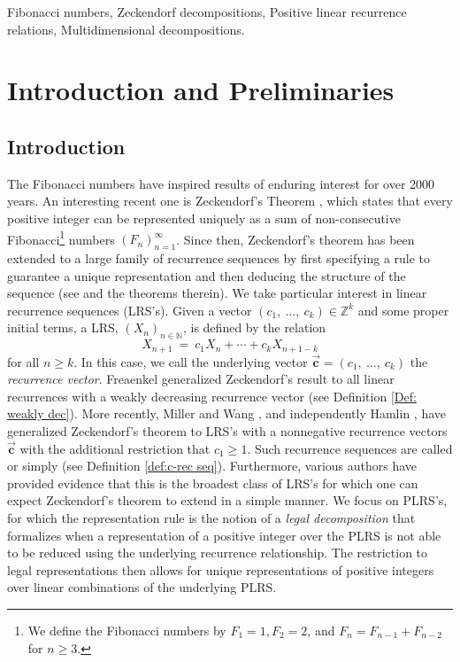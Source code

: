 \documentclass[]{interact}
\newcommand{\N}{{\mathbb N}}  %
\newcommand{\Z}{{\mathbb Z}}  %
\let\emph\relax %
\newcommand{\vtr}[1]{\vec{\mathbf{#1}}}
\theoremstyle{plain}
\numberwithin{equation}{section} %
\numberwithin{table}{section} %
\numberwithin{figure}{section}
\begin{document}
\begin{keywords}
	Fibonacci numbers, Zeckendorf decompositions, Positive
linear recurrence relations, Multidimensional decompositions.
\end{keywords}

\tableofcontents

\section{Introduction and Preliminaries}
\subsection{Introduction}
\indent \indent The Fibonacci numbers have inspired results of enduring interest for over 2000 years. An interesting recent one is Zeckendorf's Theorem \textcolor{blue}{\cite{Zeckendorf72}}, which states that every positive integer can be represented uniquely as a sum of non-consecutive Fibonacci\footnote{We define the Fibonacci numbers by $F_1 = 1,  F_2 = 2$, and $F_{n}=F_{n-1}+F_{n-2}$ for $n\geq 3$.} numbers $(F_n)_{n=1}^\infty$. Since then, Zeckendorf's theorem has been extended to a large family of recurrence sequences by first specifying a rule to guarantee a unique representation and then deducing the structure of the sequence (see \textcolor{blue}{\cite{ABJ11, BILMTB-A15, BCCSW, BDEMMTTW, BILMT2, CFHMN1, DDKMMV14, DFFHMPP, GTNP, Ha, KKMW11, MW12, MW2}} and the theorems therein). We take particular interest in linear recurrence sequences (LRS's). Given a vector $(c_1, \ \ldots , \ c_k) \in \Z^{k}$ and some proper initial terms, a LRS, $(X_n)_{n\in \N}$, is defined by the relation 
$$X_{n+1} \ =\ c_1 X_{n} + \cdots + c_k X_{n+1-k}$$
for all $n\geq k$. In this case, we call the underlying vector $\vtr{c}=(c_1, \ \ldots, \ c_k)$ the \textit{recurrence vector}. Freaenkel \textcolor{blue}{\cite{Fr}} generalized Zeckendorf's result to all linear recurrences with a weakly decreasing recurrence vector (see Definition \textcolor{blue}{\ref{Def: weakly dec}}). More recently, Miller and Wang \textcolor{blue}{\cite{MW12, MW2}}, and independently Hamlin \textcolor{blue}{\cite{Ha}}, have generalized Zeckendorf's theorem to LRS's with a nonnegative recurrence vectors $\vtr{c}$ with the additional restriction that $c_1 \geq 1$. Such recurrence sequences are called \emph{Positive Linear Recurrence Sequences} or simply \emph{PLRS's} (see Definition \textcolor{blue}{\ref{def:c-rec seq}}). Furthermore, various authors \textcolor{blue}{\cite{Ha, CFHMN1, CFHMNPX}} have provided evidence that this is the broadest class of LRS's for which one can expect Zeckendorf's theorem to extend in a simple manner. We focus on PLRS's, for which the representation rule is the notion of a \textit{legal decomposition} that formalizes when a representation of a positive integer over the PLRS is not able to be reduced using the underlying recurrence relationship. The restriction to legal representations then allows for unique representations of positive integers over linear combinations of the underlying PLRS.\\
\end{document}
